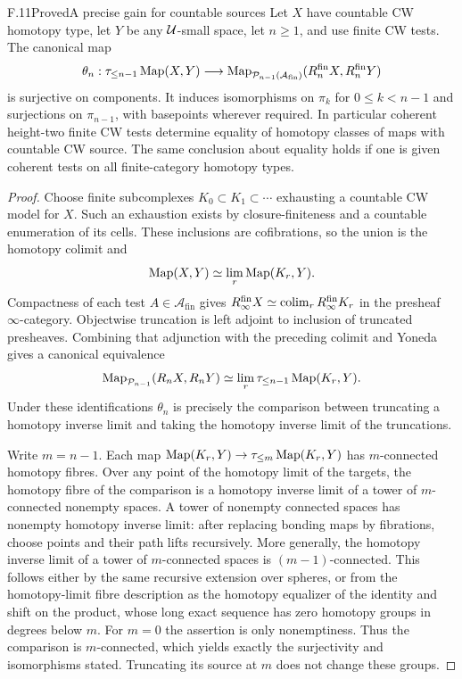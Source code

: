 \begin{claim}{F.11}{Proved}{A precise gain for countable sources}
Let $X$ have countable CW homotopy type, let $Y$ be any $\mathcal U$-small
space, let $n\geq1$, and use finite CW tests. The canonical map
\[
 \theta_n:\tau_{\leq n-1}\operatorname{Map}(X,Y)
   \longrightarrow
 \operatorname{Map}_{\mathcal P_{n-1}(\mathcal A_{\mathrm{fin}})}
       (R_n^{\mathrm{fin}}X,R_n^{\mathrm{fin}}Y)
\]
is surjective on components. It induces isomorphisms on
$\pi_k$ for $0\leq k<n-1$ and surjections on $\pi_{n-1}$,
with basepoints wherever required. In particular coherent
height-two finite CW tests determine equality of homotopy
classes of maps with countable CW source. The same conclusion
about equality holds if one is given coherent tests on all
finite-category homotopy types.
\end{claim}
\begin{proof}
Choose finite subcomplexes
$K_0\subset K_1\subset\cdots$ exhausting a countable CW model
for $X$. Such an exhaustion exists by closure-finiteness and a
countable enumeration of its cells. These inclusions are
cofibrations, so the union is the homotopy colimit and
\[
 \operatorname{Map}(X,Y)\simeq\lim_r\operatorname{Map}(K_r,Y).
\]
Compactness of each test $A\in\mathcal A_{\mathrm{fin}}$ gives
$R_{\infty}^{\mathrm{fin}}X\simeq
\operatorname{colim}_r R_{\infty}^{\mathrm{fin}}K_r$ in the presheaf
$\infty$-category. Objectwise truncation is left adjoint to
inclusion of truncated presheaves. Combining that adjunction
with the preceding colimit and Yoneda gives a canonical
equivalence
\[
 \operatorname{Map}_{\mathcal P_{n-1}}(R_nX,R_nY)
      \simeq\lim_r\tau_{\leq n-1}\operatorname{Map}(K_r,Y).
\]
Under these identifications $\theta_n$ is precisely the
comparison between truncating a homotopy inverse limit and
taking the homotopy inverse limit of the truncations.

Write $m=n-1$. Each map
$\operatorname{Map}(K_r,Y)\to\tau_{\leq m}\operatorname{Map}(K_r,Y)$ has
$m$-connected homotopy fibres. Over any point of the
homotopy limit of the targets, the homotopy fibre of the
comparison is a homotopy inverse limit of a tower of
$m$-connected nonempty spaces. A tower of nonempty connected
spaces has nonempty homotopy inverse limit: after replacing
bonding maps by fibrations, choose points and their path lifts
recursively. More generally, the homotopy inverse limit of a
tower of $m$-connected spaces is $(m-1)$-connected. This
follows either by the same recursive extension over spheres,
or from the homotopy-limit fibre description as the homotopy
equalizer of the identity and shift on the product, whose long
exact sequence has zero homotopy groups in degrees below $m$.
For $m=0$ the assertion is only nonemptiness. Thus the
comparison is $m$-connected, which yields exactly the
surjectivity and isomorphisms stated. Truncating its source
at $m$ does not change these groups.


\end{proof}
